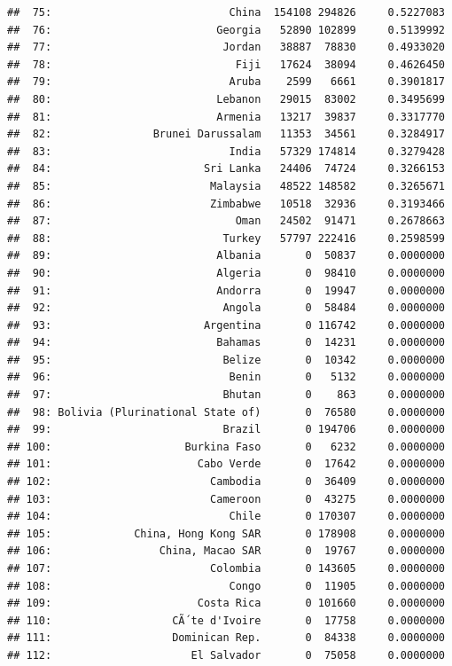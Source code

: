 \documentclass[10pt,]{article}
\begin{document}
\begin{verbatim}
##  75:                            China  154108 294826     0.5227083
##  76:                          Georgia   52890 102899     0.5139992
##  77:                           Jordan   38887  78830     0.4933020
##  78:                             Fiji   17624  38094     0.4626450
##  79:                            Aruba    2599   6661     0.3901817
##  80:                          Lebanon   29015  83002     0.3495699
##  81:                          Armenia   13217  39837     0.3317770
##  82:                Brunei Darussalam   11353  34561     0.3284917
##  83:                            India   57329 174814     0.3279428
##  84:                        Sri Lanka   24406  74724     0.3266153
##  85:                         Malaysia   48522 148582     0.3265671
##  86:                         Zimbabwe   10518  32936     0.3193466
##  87:                             Oman   24502  91471     0.2678663
##  88:                           Turkey   57797 222416     0.2598599
##  89:                          Albania       0  50837     0.0000000
##  90:                          Algeria       0  98410     0.0000000
##  91:                          Andorra       0  19947     0.0000000
##  92:                           Angola       0  58484     0.0000000
##  93:                        Argentina       0 116742     0.0000000
##  94:                          Bahamas       0  14231     0.0000000
##  95:                           Belize       0  10342     0.0000000
##  96:                            Benin       0   5132     0.0000000
##  97:                           Bhutan       0    863     0.0000000
##  98: Bolivia (Plurinational State of)       0  76580     0.0000000
##  99:                           Brazil       0 194706     0.0000000
## 100:                     Burkina Faso       0   6232     0.0000000
## 101:                       Cabo Verde       0  17642     0.0000000
## 102:                         Cambodia       0  36409     0.0000000
## 103:                         Cameroon       0  43275     0.0000000
## 104:                            Chile       0 170307     0.0000000
## 105:             China, Hong Kong SAR       0 178908     0.0000000
## 106:                 China, Macao SAR       0  19767     0.0000000
## 107:                         Colombia       0 143605     0.0000000
## 108:                            Congo       0  11905     0.0000000
## 109:                       Costa Rica       0 101660     0.0000000
## 110:                   CÃ´te d'Ivoire       0  17758     0.0000000
## 111:                   Dominican Rep.       0  84338     0.0000000
## 112:                      El Salvador       0  75058     0.0000000

\end{verbatim}
\end{document}

